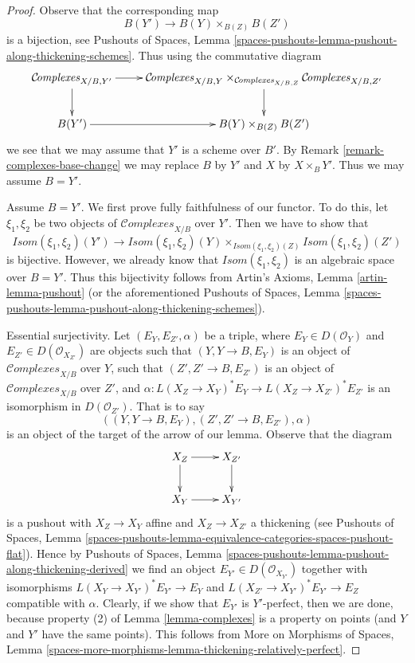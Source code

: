 \documentclass{stacks-project}
\theoremstyle{plain}
\theoremstyle{definition}
\theoremstyle{remark}
\numberwithin{equation}{subsection}
\def\Complexesstack{\mathcal{C}\!\mathit{omplexes}}
\begin{document}
\begin{proof}
Observe that the corresponding map
$$
B(Y') \longrightarrow B(Y) \times_{B(Z)} B(Z')
$$
is a bijection, see Pushouts of Spaces, Lemma
\ref{spaces-pushouts-lemma-pushout-along-thickening-schemes}.
Thus using the commutative diagram
$$
\xymatrix{
\Complexesstack_{X/B, Y'} \ar[r] \ar[d] &
\Complexesstack_{X/B, Y}
\times_{\Complexesstack_{X/B, Z}}
\Complexesstack_{X/B, Z'}
\ar[d] \\
B(Y') \ar[r] & B(Y) \times_{B(Z)} B(Z')
}
$$
we see that we may assume that $Y'$ is a scheme over $B'$. By
Remark \ref{remark-complexes-base-change}
we may replace $B$ by $Y'$ and $X$ by $X \times_B Y'$.
Thus we may assume $B = Y'$.

\medskip\noindent
Assume $B = Y'$. We first prove fully faithfulness of our functor.
To do this, let $\xi_1, \xi_2$ be two objects of $\Complexesstack_{X/B}$
over $Y'$. Then we have to show that
$$
\mathit{Isom}(\xi_1, \xi_2)(Y') \longrightarrow
\mathit{Isom}(\xi_1, \xi_2)(Y)
\times_{\mathit{Isom}(\xi_1, \xi_2)(Z)}
\mathit{Isom}(\xi_1, \xi_2)(Z')
$$
is bijective. However, we already know that $\mathit{Isom}(\xi_1, \xi_2)$
is an algebraic space over $B = Y'$. Thus this bijectivity follows from
Artin's Axioms, Lemma \ref{artin-lemma-pushout} (or the aforementioned
Pushouts of Spaces, Lemma
\ref{spaces-pushouts-lemma-pushout-along-thickening-schemes}).

\medskip\noindent
Essential surjectivity. Let $(E_Y, E_{Z'}, \alpha)$ be a triple,
where $E_Y \in D(\mathcal{O}_Y)$ and $E_{Z'} \in D(\mathcal{O}_{X_{Z'}})$
are objects such that $(Y, Y \to B, E_Y)$ is an object of
$\Complexesstack_{X/B}$ over $Y$, such that
$(Z', Z' \to B, E_{Z'})$ is an object of $\Complexesstack_{X/B}$ over $Z'$,
and $\alpha : L(X_Z \to X_Y)^*E_Y \to L(X_Z \to X_{Z'})^*E_{Z'}$
is an isomorphism in $D(\mathcal{O}_{Z'})$.
That is to say
$$
((Y, Y \to B, E_Y), (Z', Z' \to B, E_{Z'}), \alpha)
$$
is an object of the target of the arrow of our lemma.
Observe that the diagram
$$
\xymatrix{
X_Z \ar[r] \ar[d] & X_{Z'} \ar[d] \\
X_Y \ar[r] & X_{Y'}
}
$$
is a pushout with $X_Z \to X_Y$ affine and $X_Z \to X_{Z'}$ a thickening
(see Pushouts of Spaces, Lemma
\ref{spaces-pushouts-lemma-equivalence-categories-spaces-pushout-flat}).
Hence by Pushouts of Spaces, Lemma
\ref{spaces-pushouts-lemma-pushout-along-thickening-derived}
we find an object $E_{Y'} \in D(\mathcal{O}_{X_{Y'}})$
together with isomorphisms
$L(X_Y \to X_{Y'})^*E_{Y'} \to E_Y$ and
$L(X_{Z'} \to X_{Y'})^*E_{Y'} \to E_Z$
compatible with $\alpha$. Clearly, if we show that
$E_{Y'}$ is $Y'$-perfect, then we are done, because property (2)
of Lemma \ref{lemma-complexes}
is a property on points (and $Y$ and $Y'$ have the same points).
This follows from More on Morphisms of Spaces, Lemma
\ref{spaces-more-morphisms-lemma-thickening-relatively-perfect}.
\end{proof}
\end{document}

